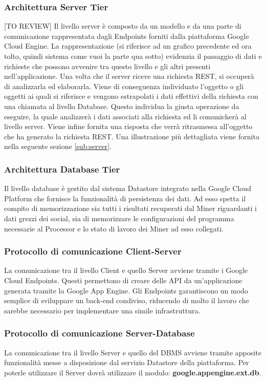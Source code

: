 		\subsubsection{Architettura Server Tier}
		[TO REVIEW] \newline
		Il livello server è composto da un modello e da una parte di comunicazione rappresentata dagli Endpoints forniti dalla piattaforma Google Cloud Engine. \newline
		La rappresentazione (si riferisce ad un grafico precedente ed ora tolto, quindi sistema come vuoi la parte qua sotto) evidenzia il passaggio di dati e richieste che possono avvenire tra questo livello e gli altri presenti nell'applicazione.
		Una volta che il server riceve una richiesta REST, si occuperà di analizzarla ed elaborarla. Viene di conseguenza individuato l’oggetto o gli oggetti ai quali si riferisce e vengono estrapolati i dati effettivi della richiesta con una chiamata al livello Database. Questo individua la giusta operazione da eseguire, la quale analizzerà i dati associati alla richiesta ed li comunicherà al livello server. Viene infine fornita una risposta che verrà ritrasmessa all'oggetto che ha generato la richiesta REST. \newline
		Una illustrazione più dettagliata viene fornita nella seguente sezione \ref{sub:server}.

		\subsubsection{Architettura Database Tier}
		Il livello database è gestito dal sistema Datastore integrato nella Google Cloud Platform che fornisce la funzionalità di persistenza dei dati. Ad esso spetta il compito di memorizzazione sia tutti i risultati recuperati dal Miner riguardanti i dati grezzi dei social, sia di memorizzare le configurazioni del programma necessarie al Processor e lo stato di lavoro dei Miner ad esso collegati.

		\subsubsection{Protocollo di comunicazione Client-Server}
		La comunicazione tra il livello Client e quello Server avviene tramite i Google Cloud Endpoints. Questi permettono di creare delle API da un'applicazione generata tramite la Google App Engine. Gli Endpoints garantiscono un modo semplice di sviluppare un back-end condiviso, riducendo di molto il lavoro che sarebbe necessario per implementare una simile infrastruttura. 


		\subsubsection{Protocollo di comunicazione Server-Database}
		La comunicazione tra il livello Server e quello del DBMS avviene tramite apposite funzionalità messe a disposizione dal servizio Datastore della piattaforma. Per poterle utilizzare il Server dovrà utilizzare il modulo: \textbf{google.appengine.ext.db}.


